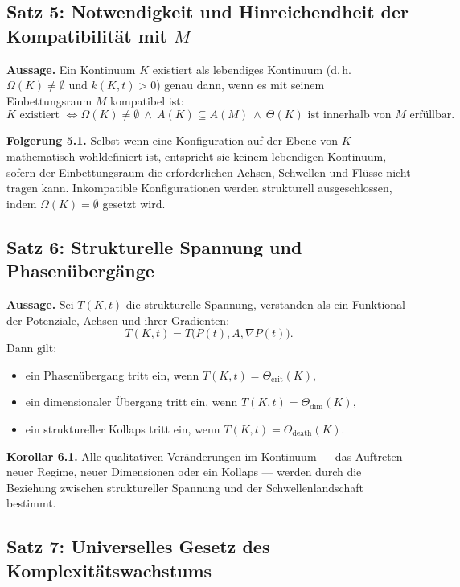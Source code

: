 \subsection{Satz 5: Notwendigkeit und Hinreichendheit der Kompatibilität mit \texorpdfstring{$M$}{M}}

\textbf{Aussage.}
Ein Kontinuum \(K\) existiert als lebendiges Kontinuum (d.\,h.\ \(\Omega(K)\neq\emptyset\) und \(k(K,t)>0\)) genau dann, wenn es mit seinem Einbettungsraum \(M\) kompatibel ist:
\[
    K \text{ existiert }
    \Longleftrightarrow
    \Omega(K) \neq \emptyset
    \ \wedge\
    A(K) \subseteq A(M)
    \ \wedge\
    \Theta(K) \text{ ist innerhalb von } M \text{ erfüllbar}.
\]

\textbf{Folgerung 5.1.}
Selbst wenn eine Konfiguration auf der Ebene von \(K\) mathematisch wohldefiniert ist, entspricht sie keinem lebendigen Kontinuum, sofern der Einbettungsraum die erforderlichen Achsen, Schwellen und Flüsse nicht tragen kann.
Inkompatible Konfigurationen werden strukturell ausgeschlossen, indem \(\Omega(K) = \emptyset\) gesetzt wird.

\subsection{Satz 6: Strukturelle Spannung und Phasenübergänge}

\textbf{Aussage.}
Sei \(T(K,t)\) die strukturelle Spannung, verstanden als ein Funktional der Potenziale, Achsen und ihrer Gradienten:
\[
    T(K,t) = T\big(P(t),A,\nabla P(t)\big).
\]
Dann gilt:
\begin{itemize}
    \item ein Phasenübergang tritt ein, wenn
          \(
              T(K,t) = \Theta_{\mathrm{crit}}(K),
          \)
    \item ein dimensionaler Übergang tritt ein, wenn
          \(
              T(K,t) = \Theta_{\mathrm{dim}}(K),
          \)
    \item ein struktureller Kollaps tritt ein, wenn
          \(
              T(K,t) = \Theta_{\mathrm{death}}(K).
          \)
\end{itemize}

\textbf{Korollar 6.1.}
Alle qualitativen Veränderungen im Kontinuum --- das Auftreten neuer Regime, neuer Dimensionen oder ein Kollaps --- werden durch die Beziehung zwischen struktureller Spannung und der Schwellenlandschaft bestimmt.

\subsection{Satz 7: Universelles Gesetz des Komplexitätswachstums}

